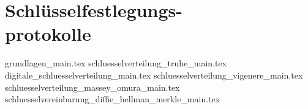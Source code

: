 
\part[Schlüsselfestlegungsprotokolle]{Schlüsselfestlegungs-\\protokolle}
\label{part-schluesselfestlegungsprotokolle}

{grundlagen_main.tex}
{schluesselverteilung_truhe_main.tex}
{digitale_schluesselverteilung_main.tex}
{schluesselverteilung_vigenere_main.tex}
{schluesselverteilung_massey_omura_main.tex}
{schluesselvereinbarung_diffie_hellman_merkle_main.tex}